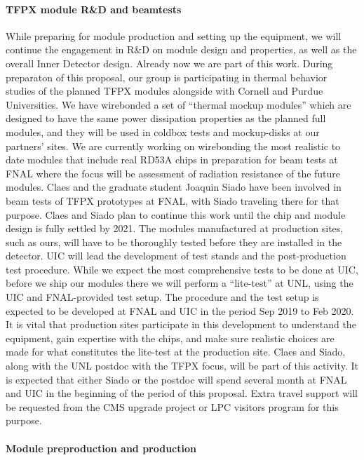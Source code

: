 \paragraph{TFPX module R\&D and beamtests}
While preparing for module production and setting up the equipment, we will continue the engagement in R\&D on module design and properties, as well as the overall Inner Detector design. Already now we are part of this work. During preparaton of this proposal, our group is participating in thermal behavior studies of the planned TFPX modules alongside with Cornell and Purdue Universities. We have wirebonded a set of ``thermal mockup modules'' which are designed to have the same power dissipation properties as the planned full modules, and they will be used in coldbox tests and mockup-disks at our partners' sites. We are currently working on wirebonding the most realistic to date modules that include real RD53A chips in preparation for beam tests at FNAL where the focus will be assessment of radiation resistance of the future modules. Claes and the graduate student Joaquin Siado have been involved in beam tests of TFPX prototypes at FNAL, with Siado traveling there for that purpose. Claes and Siado plan to continue this work until the chip and module design is fully settled by 2021. The modules manufactured at production sites, such as ours, will have to be thoroughly tested before they are installed in the detector. UIC will lead the development of test stands and the post-production test procedure. While we expect the most comprehensive tests to be done at UIC, before we ship our modules there we will perform a ``lite-test'' at UNL, using the UIC and FNAL-provided test setup. The procedure and the test setup is expected to be developed at FNAL and UIC in the period Sep 2019 to Feb 2020. It is vital that production sites participate in this development to understand the equipment, gain expertise with the chips, and make sure realistic choices are made for what constitutes the lite-test at the production site. Claes and Siado, along with the UNL postdoc with the TFPX focus, will be part of this activity. It is expected that either Siado or the postdoc will spend several month at FNAL and UIC in the beginning of the period of this proposal. Extra travel support will be requested from the CMS upgrade project or LPC visitors program for this purpose.

\paragraph{Module preproduction and production}

